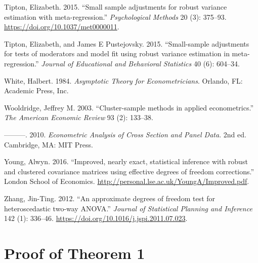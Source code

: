 \documentclass[12pt]{article}
\newlength{\cslhangindent}
\newlength{\cslentryspacingunit} %
\newenvironment{CSLReferences}[2] %
 {%
  \setlength{\parindent}{0pt}
  \ifodd #1
  \let\oldpar\par
  \def\par{\hangindent=\cslhangindent\oldpar}
  \fi
  \setlength{\parskip}{#2\cslentryspacingunit}
 }%
 {}
\begin{document}
\begin{CSLReferences}{1}{0}
\leavevmode{}%
Tipton, Elizabeth. 2015. {``{Small sample adjustments for robust
variance estimation with meta-regression.}''} \emph{Psychological
Methods} 20 (3): 375--93. \url{https://doi.org/10.1037/met0000011}.

\leavevmode{}%
Tipton, Elizabeth, and James E Pustejovsky. 2015. {``{Small-sample
adjustments for tests of moderators and model fit using robust variance
estimation in meta-regression}.''} \emph{Journal of Educational and
Behavioral Statistics} 40 (6): 604--34.

\leavevmode{}%
White, Halbert. 1984. \emph{Asymptotic Theory for Econometricians}.
Orlando, FL: Academic Press, Inc.

\leavevmode{}%
Wooldridge, Jeffrey M. 2003. {``{Cluster-sample methods in applied
econometrics}.''} \emph{The American Economic Review} 93 (2): 133--38.

\leavevmode{}%
---------. 2010. \emph{{Econometric Analysis of Cross Section and Panel
Data}}. 2nd ed. Cambridge, MA: MIT Press.

\leavevmode{}%
Young, Alwyn. 2016. {``{Improved, nearly exact, statistical inference
with robust and clustered covariance matrices using effective degrees of
freedom corrections}.''} London School of Economics.
\url{http://personal.lse.ac.uk/YoungA/Improved.pdf}.

\leavevmode{}%
Zhang, Jin-Ting. 2012. {``{An approximate degrees of freedom test for
heteroscedastic two-way ANOVA}.''} \emph{Journal of Statistical Planning
and Inference} 142 (1): 336--46.
\url{https://doi.org/10.1016/j.jspi.2011.07.023}.

\end{CSLReferences}

\newpage

\renewcommand{\thesection}{Appendix \Alph{section}}
\renewcommand{\thesubsection}{\Alph{section}.\arabic{subsection}}
\setcounter{section}{0}
\setcounter{table}{0}
\setcounter{figure}{0}
\renewcommand{\thefigure}{A\arabic{figure}}
\renewcommand{\thetable}{A\arabic{table}}

\hypertarget{app:proof1}{%
\section{Proof of Theorem 1}\label{app:proof1}}
\end{document}
